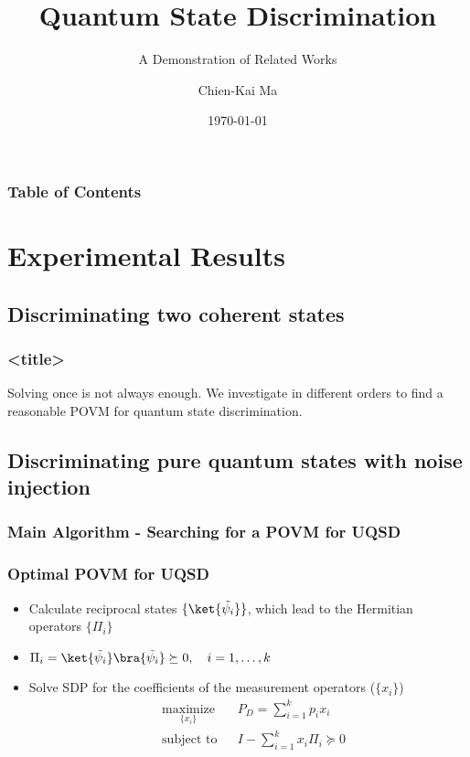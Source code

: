 \documentclass{beamer}
\title{Quantum State Discrimination}
\subtitle{A Demonstration of Related Works}
\author{Chien-Kai Ma}
\institute{NTU GIEE}
\date{\today}
\begin{document}
\begin{frame}
  \titlepage
\end{frame}

\begin{frame}
  \frametitle{Table of Contents}
  \tableofcontents
\end{frame}

\section{Experimental Results}
\subsection{Discriminating two coherent states}
\begin{frame}
  \frametitle{<title>}
  Solving once is not always enough.
  We investigate in different orders to find a reasonable POVM for
  quantum state discrimination.
\end{frame}

\subsection{Discriminating pure quantum states with noise injection}


\begin{frame}
  \frametitle{Main Algorithm - Searching for a POVM for UQSD}
  \begin{center}
    \scalebox{0.5}{
      
    }
  \end{center}
\end{frame}

\begin{frame}[label=frame3]
  \frametitle{Optimal POVM for UQSD}
  \begin{itemize}
    \item Calculate reciprocal states $\{\ket{\tilde{\psi_{i}}}\}$, which lead to the Hermitian operators $\{\Pi_{i}\}$
    \item $\Pi_{i} = \ket{\tilde{\psi_{i}}}\bra{\tilde{\psi_{i}}} \succeq 0, \quad i = 1, \ldots, k$
    \item Solve SDP for the coefficients of the measurement operators ($\{x_{i}\}$)
          \begin{align}
             & \underset{\{x_{i}\}}{\text{maximize}} &  & P_{D}=\sum_{i=1}^{k} p_{i} x_{i}           \\
             & \text{subject to}                     &  & I - \sum_{i=1}^{k} x_{i} \Pi_{i} \succeq 0
          \end{align}
  \end{itemize}
\end{frame}
\end{document}
